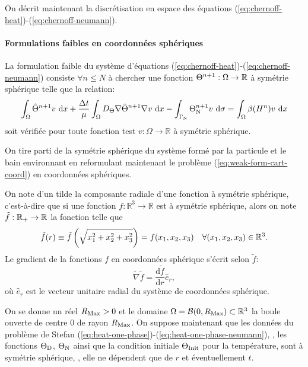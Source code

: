 On décrit maintenant la discrétisation en
espace des équations (\ref{eq:chernoff-heat})-(\ref{eq:chernoff-neumann}).

\paragraph{Formulations faibles en coordonnées sphériques}
La formulation faible du système d'équations
(\ref{eq:chernoff-heat})-(\ref{eq:chernoff-neumann}) consiste $\forall
n\leq N$ à chercher une fonction $\Theta^{n+1}:\Omega\to\mathbb R$
à symétrie sphérique telle que la relation:
\begin{equation}\label{eq:weak-form-cart-coord}
  \int_\Omega \hat\temperature^{n+1} v\,\intd{x} + \frac{\timestep}{\mu} %
  \int_\Omega \electrolytetdiff\nabla \hat\temperature^{n+1} \nabla v\,\intd{x} - %
  \int_{\Gamma_\mathrm{N}} \temperature^{n+1}_\mathrm{N} v\,\intd{\sigma} %
  = \int_\Omega \beta(\enthalpydensity^n)v\,\intd{x}
\end{equation}
soit vérifiée pour toute fonction test $v:\Omega\to\mathbb R$ à
symétrie sphérique.

On tire parti de la symétrie sphérique du système formé par la
particule et le bain environnant en reformulant maintenant le
problème (\ref{eq:weak-form-cart-coord}) en coordonnées sphériques.

On note d'un tilde la composante radiale d'une fonction à symétrie
sphérique, c'est-à-dire que si une fonction $f:\mathbb
R^3\to\mathbb R$ est à symétrie sphérique, alors on note $\tilde
f:\mathbb {\mathbb R_+}\to\mathbb R$ la fonction telle que
\begin{equation}\label{eq:spherical-symmetry}
  \tilde f(r) \equiv\tilde f\left( \sqrt{x_1^2 + x_2^2 + x_3^2} \right) = f(x_1, x_2,
  x_3)\quad \forall(x_1, x_2,x_3)\in\mathbb R^3.
\end{equation}
Le gradient de la fonctions $f$ en coordonnées sphérique s'écrit selon
$\tilde f$:
\begin{equation}\label{eq:spherical-gradient}
  \tilde\nabla\tilde f = \frac{\mathrm d\tilde f}{\mathrm dr}\hat e_r,
\end{equation}
où $\hat e_r$ est le vecteur unitaire radial du système de
coordonnées sphérique.

On se donne un réel $R_\mathrm{Max} > 0$ et le domaine $\Omega = \mathcal B(0,
R_\mathrm{Max}) \subset \mathbb R^3$ la boule ouverte de centre $0$ de rayon
$R_\mathrm{Max}$. On suppose maintenant que les données du problème de Stefan
(\ref{eq:heat-one-phase})-(\ref{eq:heat-one-phase-neumann}), \ie, les
fonctions $\Theta_\mathrm{D}$, $\Theta_\mathrm{N}$ ainsi
que la condition initiale $\Theta_\text{Init}$ pour la température, sont à
symétrie sphérique, \ie, elle ne dépendent que de $r$ et
éventuellement $t$.


